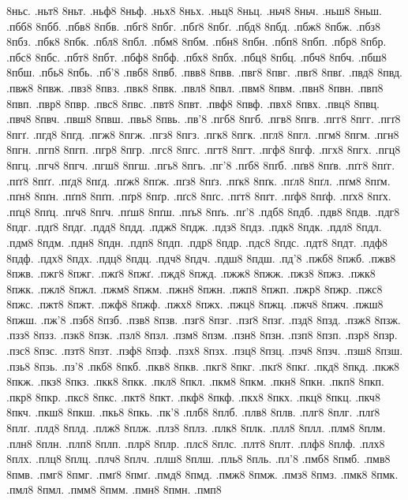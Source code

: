 {8ньс.
.ньт8
8ньт.
.ньф8
8ньф.
.ньх8
8ньх.
.ньц8
8ньц.
.ньч8
8ньч.
.ньш8
8ньш.
.пбб8
8пбб.
.пбв8
8пбв.
.пбг8
8пбг.
.пбґ8
8пбґ.
.пбд8
8пбд.
.пбж8
8пбж.
.пбз8
8пбз.
.пбк8
8пбк.
.пбл8
8пбл.
.пбм8
8пбм.
.пбн8
8пбн.
.пбп8
8пбп.
.пбр8
8пбр.
.пбс8
8пбс.
.пбт8
8пбт.
.пбф8
8пбф.
.пбх8
8пбх.
.пбц8
8пбц.
.пбч8
8пбч.
.пбш8
8пбш.
.пбь8
8пбь.
.пб'8
.пвб8
8пвб.
.пвв8
8пвв.
.пвг8
8пвг.
.пвґ8
8пвґ.
.пвд8
8пвд.
.пвж8
8пвж.
.пвз8
8пвз.
.пвк8
8пвк.
.пвл8
8пвл.
.пвм8
8пвм.
.пвн8
8пвн.
.пвп8
8пвп.
.пвр8
8пвр.
.пвс8
8пвс.
.пвт8
8пвт.
.пвф8
8пвф.
.пвх8
8пвх.
.пвц8
8пвц.
.пвч8
8пвч.
.пвш8
8пвш.
.пвь8
8пвь.
.пв'8
.пгб8
8пгб.
.пгв8
8пгв.
.пгг8
8пгг.
.пгґ8
8пгґ.
.пгд8
8пгд.
.пгж8
8пгж.
.пгз8
8пгз.
.пгк8
8пгк.
.пгл8
8пгл.
.пгм8
8пгм.
.пгн8
8пгн.
.пгп8
8пгп.
.пгр8
8пгр.
.пгс8
8пгс.
.пгт8
8пгт.
.пгф8
8пгф.
.пгх8
8пгх.
.пгц8
8пгц.
.пгч8
8пгч.
.пгш8
8пгш.
.пгь8
8пгь.
.пг'8
.пґб8
8пґб.
.пґв8
8пґв.
.пґг8
8пґг.
.пґґ8
8пґґ.
.пґд8
8пґд.
.пґж8
8пґж.
.пґз8
8пґз.
.пґк8
8пґк.
.пґл8
8пґл.
.пґм8
8пґм.
.пґн8
8пґн.
.пґп8
8пґп.
.пґр8
8пґр.
.пґс8
8пґс.
.пґт8
8пґт.
.пґф8
8пґф.
.пґх8
8пґх.
.пґц8
8пґц.
.пґч8
8пґч.
.пґш8
8пґш.
.пґь8
8пґь.
.пґ'8
.пдб8
8пдб.
.пдв8
8пдв.
.пдг8
8пдг.
.пдґ8
8пдґ.
.пдд8
8пдд.
.пдж8
8пдж.
.пдз8
8пдз.
.пдк8
8пдк.
.пдл8
8пдл.
.пдм8
8пдм.
.пдн8
8пдн.
.пдп8
8пдп.
.пдр8
8пдр.
.пдс8
8пдс.
.пдт8
8пдт.
.пдф8
8пдф.
.пдх8
8пдх.
.пдц8
8пдц.
.пдч8
8пдч.
.пдш8
8пдш.
.пд'8
.пжб8
8пжб.
.пжв8
8пжв.
.пжг8
8пжг.
.пжґ8
8пжґ.
.пжд8
8пжд.
.пжж8
8пжж.
.пжз8
8пжз.
.пжк8
8пжк.
.пжл8
8пжл.
.пжм8
8пжм.
.пжн8
8пжн.
.пжп8
8пжп.
.пжр8
8пжр.
.пжс8
8пжс.
.пжт8
8пжт.
.пжф8
8пжф.
.пжх8
8пжх.
.пжц8
8пжц.
.пжч8
8пжч.
.пжш8
8пжш.
.пж'8
.пзб8
8пзб.
.пзв8
8пзв.
.пзг8
8пзг.
.пзґ8
8пзґ.
.пзд8
8пзд.
.пзж8
8пзж.
.пзз8
8пзз.
.пзк8
8пзк.
.пзл8
8пзл.
.пзм8
8пзм.
.пзн8
8пзн.
.пзп8
8пзп.
.пзр8
8пзр.
.пзс8
8пзс.
.пзт8
8пзт.
.пзф8
8пзф.
.пзх8
8пзх.
.пзц8
8пзц.
.пзч8
8пзч.
.пзш8
8пзш.
.пзь8
8пзь.
.пз'8
.пкб8
8пкб.
.пкв8
8пкв.
.пкг8
8пкг.
.пкґ8
8пкґ.
.пкд8
8пкд.
.пкж8
8пкж.
.пкз8
8пкз.
.пкк8
8пкк.
.пкл8
8пкл.
.пкм8
8пкм.
.пкн8
8пкн.
.пкп8
8пкп.
.пкр8
8пкр.
.пкс8
8пкс.
.пкт8
8пкт.
.пкф8
8пкф.
.пкх8
8пкх.
.пкц8
8пкц.
.пкч8
8пкч.
.пкш8
8пкш.
.пкь8
8пкь.
.пк'8
.плб8
8плб.
.плв8
8плв.
.плг8
8плг.
.плґ8
8плґ.
.плд8
8плд.
.плж8
8плж.
.плз8
8плз.
.плк8
8плк.
.плл8
8плл.
.плм8
8плм.
.плн8
8плн.
.плп8
8плп.
.плр8
8плр.
.плс8
8плс.
.плт8
8плт.
.плф8
8плф.
.плх8
8плх.
.плц8
8плц.
.плч8
8плч.
.плш8
8плш.
.пль8
8пль.
.пл'8
.пмб8
8пмб.
.пмв8
8пмв.
.пмг8
8пмг.
.пмґ8
8пмґ.
.пмд8
8пмд.
.пмж8
8пмж.
.пмз8
8пмз.
.пмк8
8пмк.
.пмл8
8пмл.
.пмм8
8пмм.
.пмн8
8пмн.
.пмп8
}
